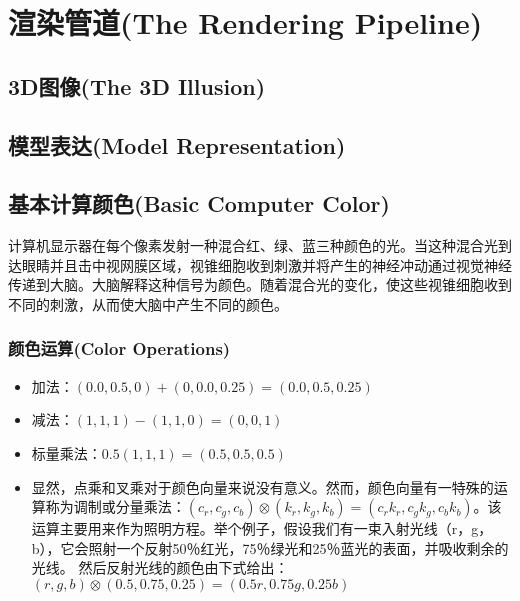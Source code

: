 \chapter{渲染管道(The Rendering Pipeline)}
\section{3D图像(The 3D Illusion)}
\section{模型表达(Model Representation)}
\section{基本计算颜色(Basic Computer Color)}
\begin{flushleft}
计算机显示器在每个像素发射一种混合红、绿、蓝三种颜色的光。当这种混合光到达眼睛并且击中视网膜区域，视锥细胞收到刺激并将产生的神经冲动通过视觉神经传递到大脑。大脑解释这种信号为颜色。随着混合光的变化，使这些视锥细胞收到不同的刺激，从而使大脑中产生不同的颜色。\\
\end{flushleft}

\subsection{颜色运算(Color Operations)}
\begin{itemize}
    \item 加法：$(0.0, 0.5, 0) + (0, 0.0, 0.25) = (0.0, 0.5, 0.25)$
    \item 减法：$(1, 1, 1) - (1, 1, 0) = (0, 0, 1)$
    \item 标量乘法：$0.5(1, 1, 1) = (0.5, 0.5, 0.5)$
    \item 显然，点乘和叉乘对于颜色向量来说没有意义。然而，颜色向量有一特殊的运算称为调制或分量乘法：$(c_{r},c_{g},c_{b}) \otimes (k_{r},k_{g},k_{b}) = (c_{r}k_{r},c_{g}k_{g},c_{b}k_{b})$。该运算主要用来作为照明方程。举个例子，假设我们有一束入射光线（r，g，b），它会照射一个反射50％红光，75％绿光和25％蓝光的表面，并吸收剩余的光线。 然后反射光线的颜色由下式给出：$(r,g,b) \otimes (0.5,0.75,0.25) = (0.5r,0.75g,0.25b)$
\end{itemize}

